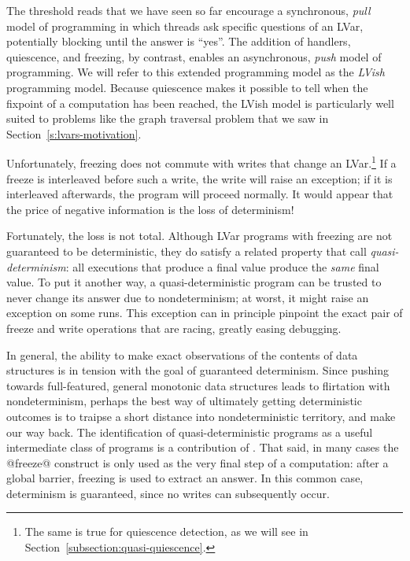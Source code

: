 The threshold reads that we have seen so far encourage a
synchronous, \emph{pull} model of programming in which threads ask
specific questions of an LVar, potentially blocking until the answer
is ``yes''.  The addition of handlers, quiescence, and freezing, by contrast, enables
an asynchronous, \emph{push} model of programming.  We will refer to
this extended programming model as the \emph{LVish} programming model.  Because quiescence
makes it possible to tell when the fixpoint of a computation has been
reached, the LVish model is particularly well suited to problems like
the graph traversal problem that we saw in
Section~\ref{s:lvars-motivation}.

Unfortunately, freezing does not commute with writes that change an
LVar.\footnote{The same is true for quiescence detection, as we will see in
Section~\ref{subsection:quasi-quiescence}.}  If a freeze is
interleaved before such a write, the write will raise an exception; if
it is interleaved afterwards, the program will proceed normally.  It
would appear that the price of negative information is the loss of
determinism!

Fortunately, the loss is not total.  Although LVar programs with
freezing are not guaranteed to be deterministic, they do satisfy a
related property that  call \emph{quasi-determinism}: all executions
that produce a final value produce the \emph{same} final value.  To
put it another way, a quasi-deterministic program can be trusted to
never change its answer due to nondeterminism; at worst, it might
raise an exception on some runs.  This exception can in principle
pinpoint the exact pair of freeze and write operations that are
racing, greatly easing debugging.

In general, the ability to make exact observations of the contents of
data structures is in tension with the goal of guaranteed determinism.
Since pushing towards full-featured, general monotonic data structures
leads to flirtation with nondeterminism, perhaps the best way of
ultimately getting deterministic outcomes is to traipse a short
distance into nondeterministic territory, and make our way back.  The
identification of quasi-deterministic programs as a useful
intermediate class of programs is a contribution of .
That said, in many cases the @freeze@ construct is only used as the
very final step of a computation: after a global barrier, freezing is
used to extract an answer.  In this common case, determinism is
guaranteed, since no writes can subsequently occur.

